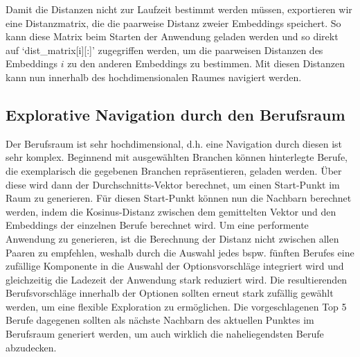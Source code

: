 \documentclass[10pt]{article}
\begin{document}
Damit die Distanzen nicht zur Laufzeit bestimmt werden müssen, exportieren wir
eine Distanzmatrix, die die paarweise Distanz zweier Embeddings speichert. So
kann diese Matrix beim Starten der Anwendung geladen werden und so direkt auf
`dist\_matrix[i][:]' zugegriffen werden, um die paarweisen Distanzen des
Embeddings $i$ zu den anderen Embeddings zu bestimmen. Mit diesen Distanzen kann
nun innerhalb des hochdimensionalen Raumes navigiert werden.

\subsection{Explorative Navigation durch den Berufsraum}

Der Berufsraum ist sehr hochdimensional, d.h. eine Navigation durch diesen ist
sehr komplex. Beginnend mit ausgewählten Branchen können hinterlegte Berufe, die
exemplarisch die gegebenen Branchen repräsentieren, geladen werden. Über diese
wird dann der Durchschnitts-Vektor berechnet, um einen Start-Punkt im Raum zu
generieren. Für diesen Start-Punkt können nun die Nachbarn berechnet werden,
indem die Kosinus-Distanz zwischen dem gemittelten Vektor und den Embeddings der
einzelnen Berufe berechnet wird. Um eine performente Anwendung zu generieren,
ist die Berechnung der Distanz nicht zwischen allen Paaren zu empfehlen, weshalb
durch die Auswahl jedes bspw. fünften Berufes eine zufällige Komponente in die
Auswahl der Optionsvorschläge integriert wird und gleichzeitig die Ladezeit der
Anwendung stark reduziert wird. Die resultierenden Berufsvorschläge innerhalb
der Optionen sollten erneut stark zufällig gewählt werden, um eine flexible
Exploration zu ermöglichen. Die vorgeschlagenen Top 5 Berufe dagegenen sollten
als nächste Nachbarn des aktuellen Punktes im Berufsraum generiert werden, um
auch wirklich die naheliegendsten Berufe abzudecken.
\end{document}
